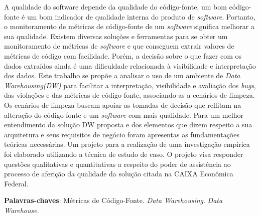 \begin{resumo}




A qualidade do software depende da qualidade do código-fonte, um bom código-fonte é um bom indicador de
qualidade interna do produto de \textit{software}. Portanto, o monitoramento de métricas de código-fonte de um \textit{software} significa melhorar a sua qualidade. Existem diversas soluções e ferramentas para se obter um monitoramento de métricas de \textit{software} e que conseguem extrair valores de métricas de código com facilidade. Porém, a decisão sobre o que fazer com os dados extraídos ainda é uma
dificuldade relacionada à visibilidade e interpretação dos dados. Este trabalho se propõe a analisar o uso de um ambiente de \textit{Data Warehousing(DW)} para facilitar a interpretação, visibilidade e avaliação dos \textit{bugs}, das violações e das métricas de código-fonte, associando-as a cenários de limpeza. Os cenários de limpeza buscam apoiar as tomadas de decisão que reflitam na alteração do código-fonte e um \textit{software} com mais qualidade. Para um melhor entendimento da solução DW proposta e dos elementos que dizem respeito a sua arquitetura e seus requisitos de negócio foram apresentas as fundamentações teóricas necessárias. Um projeto para a realização de uma investigação empírica foi elaborado utilizando a técnica de estudo de caso. O projeto visa responder questões qualitativas e quantitativas a respeito do poder de assistência ao processo de aferição da qualidade da solução citada na CAIXA Econômica Federal.
 
 

 \vspace{\onelineskip}
    
 \noindent
 \textbf{Palavras-chaves}: Métricas de Código-Fonte. \textit{Data Warehousing}. \textit{Data Warehouse}.
\end{resumo}
